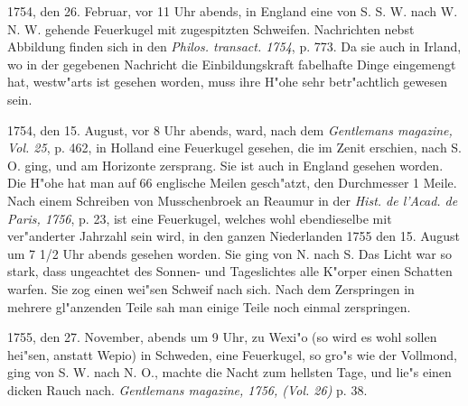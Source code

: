 \documentclass[a4paper, 11pt, oneside, polutonikogreek, german]{article}
\begin{document}
1754, den 26. Februar, vor 11 Uhr abends, in England eine von S. S. W. nach W. N. W. gehende Feuerkugel mit zugespitzten Schweifen. Nachrichten nebst Abbildung finden sich in den \emph{Philos. transact. 1754}, p. 773. Da sie auch in Irland, wo in der gegebenen Nachricht die Einbildungskraft fabelhafte Dinge eingemengt hat, westw"arts ist gesehen worden, muss ihre H"ohe sehr betr"achtlich gewesen sein.

1754, den 15. August, vor 8 Uhr abends, ward, nach dem \emph{Gentlemans magazine, Vol. 25}, p. 462, in Holland eine Feuerkugel gesehen, die im Zenit erschien, nach S. O. ging, und am Horizonte zersprang. Sie ist auch in England gesehen worden. Die H"ohe hat man auf 66 englische Meilen gesch"atzt, den Durchmesser 1 Meile. Nach einem Schreiben von Musschenbroek an Reaumur in der \emph{Hist. de l'Acad. de Paris, 1756}, p. 23, ist eine Feuerkugel, welches wohl ebendieselbe mit ver"anderter Jahrzahl sein wird, in den ganzen Niederlanden 1755 den 15. August um 7 1/2 Uhr abends gesehen worden. Sie ging von N. nach S. Das Licht war so stark, dass ungeachtet des Sonnen- und Tageslichtes alle K"orper einen Schatten warfen. Sie zog einen wei"sen Schweif nach sich. Nach dem Zerspringen in mehrere gl"anzenden Teile sah man einige Teile noch einmal zerspringen.

1755, den 27. November, abends um 9 Uhr, zu Wexi"o (so wird es wohl sollen hei"sen, anstatt Wepio) in Schweden, eine Feuerkugel, so gro"s wie der Vollmond, ging von S. W. nach N. O., machte die Nacht zum hellsten Tage, und lie"s einen dicken Rauch nach. \emph{Gentlemans magazine, 1756, (Vol. 26)} p. 38.
\end{document}
